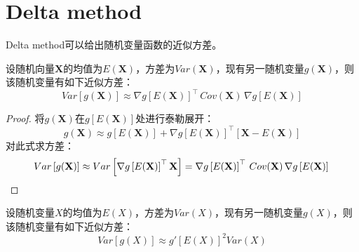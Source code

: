 \section{Delta method}
Delta method可以给出随机变量函数的近似方差。
\begin{theorem}\label{sec:deltamethod}
	设随机向量$\mathbf{X}$的均值为$E(\mathbf{X})$，方差为$Var(\mathbf{X})$，现有另一随机变量$g(\mathbf{X})$，则该随机变量有如下近似方差：
	\begin{equation*}
		Var[g(\mathbf{X})] \approx \nabla g\left[ E(\mathbf{X})\right] ^\top \, Cov(\mathbf{X}) \, \nabla g\left[E(\mathbf{X})\right] 
	\end{equation*}
\end{theorem}
\begin{proof}
	将$g(\mathbf{X})$在$g\left[E(\mathbf{X})\right]$处进行泰勒展开：
	\begin{equation*}
		g(\mathbf{X})\approx g\left[E(\mathbf{X})\right]+
		\nabla g\left[E(\mathbf{X})\right]^\top\left[\mathbf{X}-E(\mathbf{X})\right]
	\end{equation*}
	对此式求方差：
	\begin{equation*}
		Var\left[g(\mathbf{X})\right]\approx Var\left[ \nabla g\left[E(\mathbf{X})\right]^\top\mathbf{X}\right]=\nabla g\left[ E(\mathbf{X})\right] ^\top \, Cov(\mathbf{X}) \, \nabla g\left[E(\mathbf{X})\right]\qedhere
	\end{equation*}
\end{proof}
\begin{corollary}
	设随机变量$X$的均值为$E(X)$，方差为$Var(X)$，现有另一随机变量$g(X)$，则该随机变量有如下近似方差：
	\begin{equation*}
		Var\left[g(X)\right]\approx g'\left[E(X)\right]^2Var(X)
	\end{equation*}
\end{corollary}